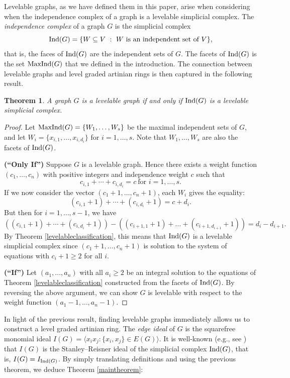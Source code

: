 \documentclass[12pt]{amsart}
\numberwithin{equation}{section}
\newtheorem{theorem}{Theorem}[section]
\theoremstyle{definition}
\newcounter{i} %
\begin{document}
Levelable graphs, as we have defined them in this paper,
arise when considering when the independence complex of a graph is 
a levelable simplicial complex.  The {\it independence complex}
of a graph $G$ is the simplicial complex
\[
{\rm Ind}(G) = \{W \subseteq V ~:~ \mbox{$W$ is an  independent set of $V$}\},
\]
that is, the faces of ${\rm Ind}(G)$ are 
the independent sets of $G$. 
The facets of ${\rm Ind}(G)$ is the set ${\rm MaxInd}(G)$ that we 
defined in the introduction.  The connection between levelable
graphs and level graded artinian rings is then captured in the following
result.

\begin{theorem}
    A graph $G$ is a levelable
    graph if and only if ${\rm Ind}(G)$ is a levelable
    simplicial complex.
\end{theorem}

\begin{proof}
Let ${\rm MaxInd}(G) = \{W_1,\ldots,W_s\}$ be the maximal
independent sets of $G$, and let $W_i = \{x_{i,1},\ldots,
x_{i,d_i}\}$ for $i=1,\ldots,s$.  Note that
$W_1,\ldots,W_s$ are also the facets of ${\rm Ind}(G)$.

{\bf (``Only If'')}  Suppose $G$ is a levelable graph.  Hence there exists a weight function $(c_1,\ldots,c_n)$ with positive integers 
and independence weight $c$ such that
\[
    c_{i,1} + \cdots + c_{i,d_i}  =  c  
    ~\mbox{for $i=1,\ldots,s$}. 
\]
If we now consider the vector $(c_1+1,\ldots,c_n+1)$, each
$W_i$ gives the equality:
\[(c_{i,1}+1)+\cdots +(c_{i,d_i}+1) = c+d_i.\]
But then for  $i=1,\ldots,s-1$, we have
\[((c_{i,1}+1)+\cdots+(c_{i,d_i}+1)) - 
((c_{i+1,1}+1)+\ldots + (c_{i+1, d_{i+1}}+1)) =
d_i-d_{i+1}.\]
By Theorem \ref{levelableclassification}, this
means that ${\rm Ind}(G)$ is a levelable simplicial 
complex since $(c_1+1,\ldots,c_n+1)$ is  solution
to the system of equations with $c_i+1 \geq 2$ for all $i$.

{\bf (``If'')}  Let $(a_1,\ldots,a_n)$ with all $a_i \geq 2$
be an integral solution to the equations of
Theorem \ref{levelableclassification} constructed
from the facets of ${\rm Ind}(G)$.  By reversing
the above argument, we can show $G$ is levelable
with respect to the weight function $(a_1-1,\ldots,a_n-1)$.
\end{proof}


In light of the previous result,
finding levelable graphs immediately 
allows us to construct a level graded artinian  ring.  The 
{\it edge ideal} of $G$ is the squarefree monomial ideal
$I(G) = \langle x_ix_j : \{x_i,x_j\} \in E(G) \rangle$.  It is 
well-known (e.g., see \cite{HHgtm260}) that $I(G)$ is the 
Stanley--Reisner ideal of the simplicial complex ${\rm Ind}(G)$, that is, $I(G) = I_{{\rm Ind}(G)}$.
By simply translating definitions and using the previous theorem,
we deduce Theorem \ref{maintheorem}:
\end{document}
